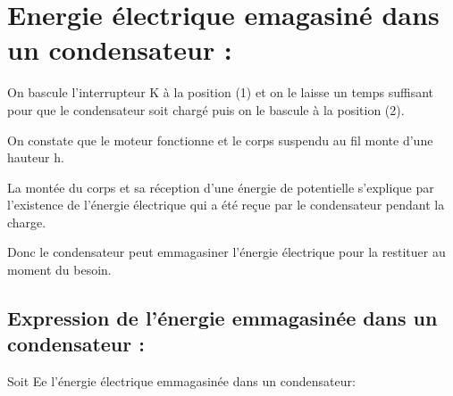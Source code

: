 \documentclass[12pt]{article}
\begin{document}
\section{Energie électrique emagasiné dans un condensateur : }


On bascule l'interrupteur K à la position (1) et on le laisse un temps suffisant pour que le condensateur soit chargé puis on le
bascule à la position (2).

On constate que le moteur fonctionne et le corps suspendu au fil monte d'une hauteur h.

La montée du corps et sa réception d’une énergie de potentielle s'explique par l'existence de l'énergie électrique qui a été reçue par
le condensateur pendant la charge.

Donc le condensateur peut emmagasiner l'énergie électrique pour la restituer au moment du besoin.


\subsection{Expression de l'énergie emmagasinée dans un condensateur : }

Soit Ee l'énergie électrique emmagasinée dans un condensateur: 

\end{document}

